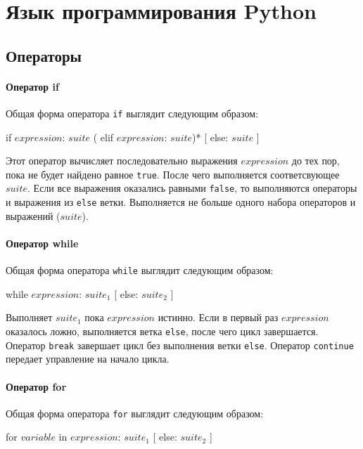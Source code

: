 \chapter{Язык программирования Python}
\label{ch:python}

\section{Операторы}
\label{sec:py-statements}

\subsubsection{Оператор if}
Общая форма оператора \lstinline{if} выглядит следующим образом:
\begin{pylst}{}{}
if $expression$: $suite$
( elif $expression$: $suite$)*
[ else: $suite$ ]
\end{pylst}

Этот оператор вычисляет последовательно выражения $expression$ до тех пор, пока не будет найдено равное \lstinline{true}. После чего выполняется соответсвующее $suite$. Если все выражения оказались равными \lstinline{false}, то выполняются операторы и выражения из \lstinline{else} ветки. Выполняется не больше одного набора операторов и выражений ($suite$).

\subsubsection{Оператор while}
Общая форма оператора \lstinline{while} выглядит следующим образом:
\begin{pylst}{}{}
while $expression$: $suite_1$
[ else: $suite_2$ ]
\end{pylst}

Выполняет $suite_1$ пока $expression$ истинно. Если в первый раз $expression$ оказалось ложно, выполняется ветка \lstinline{else}, после чего цикл завершается. Оператор \lstinline{break} завершает цикл без выполнения ветки \lstinline{else}. Оператор \lstinline{continue} передает управление на начало цикла.

\subsubsection{Оператор for}
Общая форма оператора \lstinline{for} выглядит следующим образом:
\begin{pylst}{}{}
for $variable$ in $expression$: $suite_1$
[ else: $suite_2$ ]
\end{pylst}

